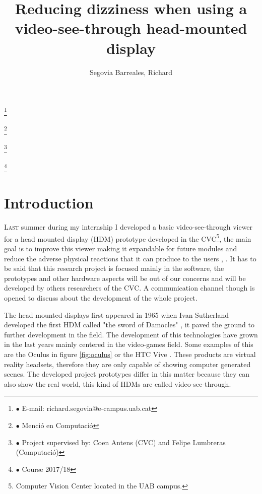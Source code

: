 \documentclass[10pt,a4paper,twocolumn,twoside]{article}
\author{\LARGE\sffamily Segovia Barreales, Richard}
\title{\Huge{\sffamily Reducing dizziness when using a video-see-through head-mounted display}}
\date{}
\newcommand\blfootnote[1]{%
	\begingroup
	\renewcommand\thefootnote{}\footnote{#1}%
	\addtocounter{footnote}{-1}%
	\endgroup
}
\begin{document}
	
	\fancyhead[RO]{\thepage}
	\fancyhead[LE]{\thepage}
	
	\fancyfoot[CO,CE]{}
	
	{
		\fancyhf{}
	}
	
	\renewcommand{\headrulewidth}{0pt}
	\renewcommand{\footrulewidth}{0pt}
	\pagestyle{fancy}
	
	\maketitle
	
	\thispagestyle{primerapagina}
	
	
	\blfootnote{$\bullet$ E-mail: richard.segovia@e-campus.uab.cat}
	\blfootnote{$\bullet$ Menció en Computació}
	\blfootnote{$\bullet$ Project supervised by: Coen Antens (CVC) and Felipe Lumbreras (Computació)}
	\blfootnote{$\bullet$ Course 2017/18}
	
	\section{Introduction}
	
	\lettrine[lines=3]{L}{ast} summer during my internship I developed a basic video-see-through viewer for a head mounted display (HDM) prototype developed in the CVC\footnote{Computer Vision Center located in the UAB campus.}, the main goal is to improve this viewer making it expandable for future modules and reduce the adverse physical reactions that it can produce to the users \cite{disconfortReview}, \cite{unpublishCVC}. It has to be said that this research project is focused mainly in the software, the prototypes and other hardware aspects will be out of our concerns and will be developed by others researchers of the CVC. A communication channel though is opened to discuss about the development of the whole project.
	
	The head mounted displays first appeared in 1965 when Ivan Sutherland developed the first HDM called "the sword of Damocles" \cite{hdmSutherland}, it paved the ground to further development in the field. The development of this technologies have grown in the last years mainly centered in the video-games field. Some examples of this are the Oculus \cite{web:oculus} in figure \ref{fig:oculus} or the HTC Vive \cite{web:vive}. These products are virtual reality headsets, therefore they are only capable of showing computer generated scenes. The developed project prototypes differ in this matter because they can also show the real world, this kind of HDMs are called video-see-through.
	
\end{document}
